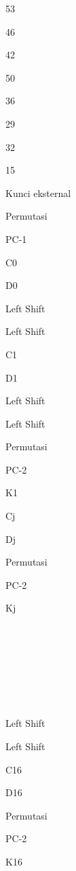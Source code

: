 \documentclass{article}
\begin{document}
53 

46 

42 

50 

36 

29 

32 


15

Kunci eksternal

Permutasi

PC-1

C0

D0

Left Shift

Left Shift

C1

D1

Left Shift

Left Shift

Permutasi

PC-2

K1

Cj

Dj

Permutasi

PC-2

Kj









Left Shift

Left Shift

C16

D16

Permutasi

PC-2

K16
\end{document}
